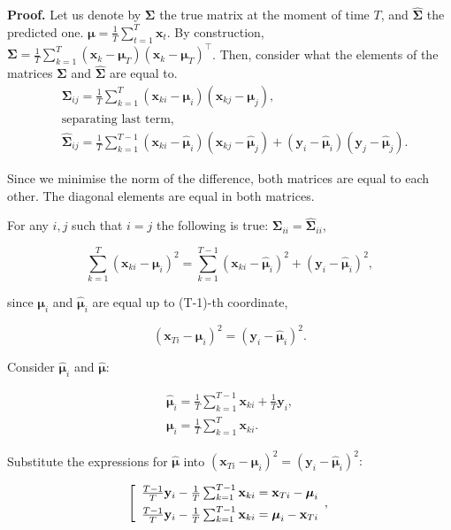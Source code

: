 \documentclass[12pt]{article}
\begin{document}
\textbf{Proof.} Let us denote by $\mathbf{\Sigma}$ the true matrix at the moment of time $T$, and $\hat{\mathbf{\Sigma}}$ the predicted one. $\boldsymbol{\mu} = \frac{1}{T} \sum_{t=1}^{T} \mathbf{x}_t$. By construction, ${\mathbf{\Sigma}} = \frac{1}{T} \sum_{k=1}^{T} (\mathbf{x}_k - \boldsymbol{\mu}_T)(\mathbf{x}_k - \boldsymbol{\mu}_T)^\intercal$. Then, consider what the elements of the matrices $\mathbf{\Sigma}$ and $\hat{\mathbf{\Sigma}}$ are equal to.
\begin{align*}
	&\mathbf{\Sigma}_{ij} = \frac{1}{T}\sum_{k=1}^{T}(\mathbf{x}_{ki} - \boldsymbol{\mu}_i)(\mathbf{x}_{kj}-\boldsymbol{\mu}_j),\\
    &\text{separating last term,}\\
	&\hat{\mathbf{\Sigma}}_{ij} = \frac{1}{T}\sum_{k=1}^{T-1}(\mathbf{x}_{ki} - \hat{\boldsymbol{\mu}}_i)(\mathbf{x}_{kj}-\hat{\boldsymbol{\mu}}_j) + (\mathbf{y}_i - \hat{\boldsymbol{\mu}}_i)(\mathbf{y}_j - \hat{\boldsymbol{\mu}}_j).
\end{align*}

Since we minimise the norm of the difference, both matrices are equal to each other. The diagonal elements are equal in both matrices.

For any $i, j$ such that $i = j$ the following is true: $\mathbf{\Sigma}_{ii} = \hat{\mathbf{\Sigma}}_{ii}$,

$$\sum_{k=1}^{T}(\mathbf{x}_{ki}-\boldsymbol{\mu}_i)^{2} = \sum_{k=1}^{T-1}(\mathbf{x}_{ki} - \hat{\boldsymbol{\mu}}_i)^{2} + (\mathbf{y}_i - \hat{\boldsymbol{\mu}}_i)^{2},$$
	
since $\boldsymbol{\mu}_i$ and $\hat{\boldsymbol{\mu}}_i$ are equal up to (T-1)-th coordinate,

$$(\mathbf{x}_{Ti}-\boldsymbol{\mu}_i)^2 = (\mathbf{y}_i-\hat{\boldsymbol{\mu}}_i)^2.$$

Consider $\hat{\boldsymbol{\mu}}_i$ and $\hat{\boldsymbol{\mu}}:$

\begin{gather*}
\hat{\boldsymbol{\mu}}_i = \frac{1}{T}\sum_{k=1}^{T-1}\mathbf{x}_{ki} + \frac{1}{T}\mathbf{y}_i,\\
\boldsymbol{\mu}_i = \frac{1}{T}\sum_{k=1}^{T}\mathbf{x}_{ki}.
\end{gather*}

Substitute the expressions for $\hat{\boldsymbol{\mu}}$ into $(\mathbf{x}_{Ti}-\boldsymbol{\mu}_i)^2 = (\mathbf{y}_i-\hat{\boldsymbol{\mu}}_i)^2:$

$$
	\left[
	\begin{array}{ll}
		\frac{T-1}{T}\mathbf{y}_i-\frac{1}{T}\sum_{k=1}^{T-1}\mathbf{x}_{ki}=\mathbf{x}_{Ti}-\boldsymbol{\mu}_i
		\\[1ex]
		\frac{T-1}{T}\mathbf{y}_i-\frac{1}{T}\sum_{k=1}^{T-1}\mathbf{x}_{ki}=\boldsymbol{\mu}_i-\mathbf{x}_{Ti}
	\end{array},
	\right .\\[1ex]
$$
\end{document}

